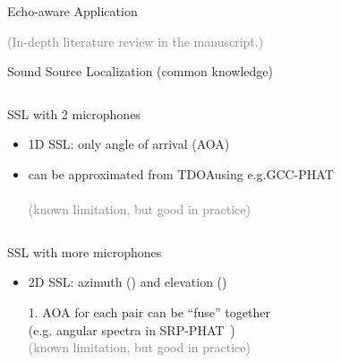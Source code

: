 \begin{frame}[t]{Echo-aware Application \hfill\faBook}
    \begin{center}
        \textcolor{gray}{\small (In-depth literature review in the manuscript.)}
    \end{center}
\end{frame}

\begin{frame}{Sound Source Localization {\hfill\small (common knowledge)} \faBook}

    \begin{columns}[T,onlytextwidth]
        \begin{block}{SSL with 2 microphones}
            \begin{itemize}
                \item 1D SSL: only angle of arrival (\alert{AOA})\iconAOA
                \item can be approximated from \alert{TDOA}using e.g.GCC-PHAT
                \\\cite{knapp1976generalized}
                \\\textcolor{gray}{\small (known limitation, but good in practice)}
            \end{itemize}
        \end{block}
    \end{columns}
    \pause

    \begin{columns}[T,onlytextwidth]
        \begin{block}{SSL with more microphones}
            \begin{itemize}
                \item 2D SSL: azimuth (\faArrowsAltH) and elevation (\faArrowsAltV)
                \item[1.] AOA for each pair can be ``fuse''  together
                \\(e.g. angular spectra in SRP-PHAT~\cite{dibiase2001robust})
                \\\textcolor{gray}{\small (known limitation, but good in practice)}
            \end{itemize}
        \end{block}
    \end{columns}

\end{frame}

